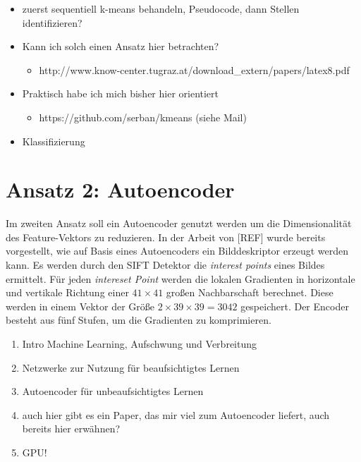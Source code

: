 
\begin{itemize}
	\item zuerst sequentiell k-means behandeln, Pseudocode, dann Stellen identifizieren?
	\item Kann ich solch einen Ansatz hier betrachten? \begin{itemize}
		\item http://www.know-center.tugraz.at/download\_extern/papers/latex8.pdf
\end{itemize}
	\item Praktisch habe ich mich bisher hier orientiert \begin{itemize}
		\item https://github.com/serban/kmeans (siehe Mail)
\end{itemize}	
	\item Klassifizierung
\end{itemize}

\section{Ansatz 2: Autoencoder}

Im zweiten Ansatz soll ein Autoencoder genutzt werden um die Dimensionalität des Feature-Vektors zu reduzieren. In der Arbeit von [REF] wurde bereits vorgestellt, wie auf Basis eines Autoencoders ein Bilddeskriptor erzeugt werden kann. Es werden durch den SIFT Detektor die \textit{interest points} eines Bildes ermittelt. Für jeden \textit{intereset Point} werden die lokalen Gradienten in horizontale und vertikale Richtung einer $41 \times 41$ großen Nachbarschaft berechnet. Diese werden in einem Vektor der Größe $2 \times 39 \times 39 = 3042$ gespeichert. Der Encoder besteht aus fünf Stufen, um die Gradienten zu komprimieren.

\begin{enumerate}
	\item Intro Machine Learning, Aufschwung und Verbreitung 
	\item Netzwerke zur Nutzung für beaufsichtigtes Lernen
	\item Autoencoder für unbeaufsichtigtes Lernen
	\item auch hier gibt es ein Paper, das mir viel zum Autoencoder liefert, auch bereits hier erwähnen?
	\item GPU!
\end{enumerate}